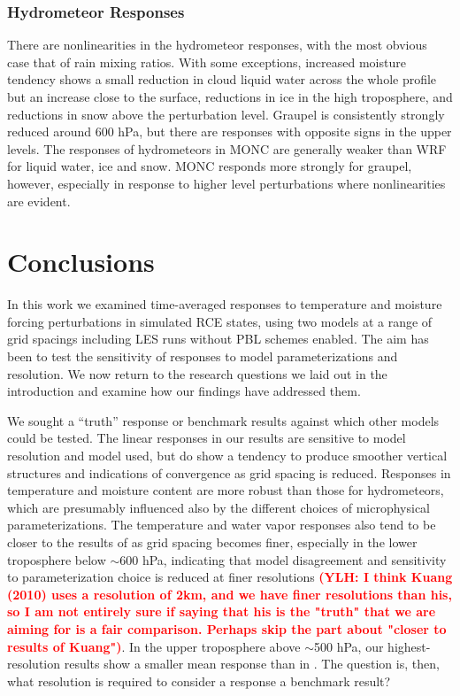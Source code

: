 \documentclass[draft]{agujournal2019}
\newcommand{\todo}[1]{\textcolor{red}{\textbf{(#1)}}}
\begin{document}
\subsubsection{Hydrometeor Responses}

There are nonlinearities in the hydrometeor responses, with the most obvious
case that of rain mixing ratios. With some exceptions, increased moisture
tendency shows a small reduction in cloud liquid water across the whole profile
but an increase close to the surface, reductions in ice in the high troposphere,
and reductions in snow above the perturbation level. Graupel is consistently
strongly reduced around 600 hPa, but there are responses with opposite signs in
the upper levels. The responses of hydrometeors in MONC are generally weaker
than WRF for liquid water, ice and snow. MONC responds more strongly for
graupel, however, especially in response to higher level perturbations where
nonlinearities are evident.

\section{Conclusions}
\label{sec:conclusions}

In this work we examined time-averaged responses to temperature and moisture
forcing perturbations in simulated RCE states, using two models at a range of
grid spacings including LES runs without PBL schemes enabled. The aim has been
to test the sensitivity of responses to model parameterizations and resolution.
We now return to the research questions we laid out in the introduction and
examine how our findings have addressed them.

We sought a ``truth'' response or benchmark results against which other models
could be tested. The linear responses in our results are sensitive to model
resolution and model used, but do show a tendency to produce smoother vertical
structures and indications of convergence as grid spacing is reduced. Responses
in temperature and moisture content are more robust than those for hydrometeors,
which are presumably influenced also by the different choices of microphysical
parameterizations. The temperature and water vapor responses also tend to be
closer to the results of  as grid spacing becomes finer,
especially in the lower troposphere below $\sim$600 hPa, indicating that model
disagreement and sensitivity to parameterization choice is reduced at finer
resolutions \todo{YLH: I think Kuang (2010) uses a resolution of 2km, and we have finer resolutions than his, so I am not entirely sure if saying that his is the "truth" that we are aiming for is a fair comparison. Perhaps skip the part about "closer to results of Kuang"}. In the upper troposphere above $\sim$500 hPa, our
highest-resolution results show a smaller mean response than in
. The question is, then, what resolution is required to
consider a response a benchmark result?
\end{document}
